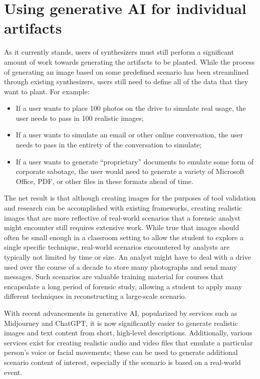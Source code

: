 \documentclass[letterpaper,12pt]{report}
\def\tightlist{}
\begin{document}
\section{Using generative AI for individual
artifacts}\label{using-generative-ai-for-individual-artifacts}

As it currently stands, users of synthesizers must still perform a
significant amount of work towards generating the artifacts to be
planted. While the process of generating an image based on some
predefined scenario has been streamlined through existing synthesizers,
users still need to define all of the data that they want to plant. For
example:

\begin{itemize}
\tightlist
\item
  If a user wants to place 100 photos on the drive to simulate real
  usage, the user needs to pass in 100 realistic images;
\item
  If a user wants to simulate an email or other online conversation, the
  user needs to pass in the entirety of the conversation to simulate;
\item
  If a user wants to generate ``proprietary'' documents to emulate some
  form of corporate sabotage, the user would need to generate a variety
  of Microsoft Office, PDF, or other files in these formats ahead of
  time.
\end{itemize}

The net result is that although creating images for the purposes of tool
validation and research can be accomplished with existing frameworks,
creating realistic images that are more reflective of real-world
scenarios that a forensic analyst might encounter still requires
extensive work. While true that images should often be small enough in a
classroom setting to allow the student to explore a single specific
technique, real-world scenarios encountered by analysts are typically
not limited by time or size. An analyst might have to deal with a drive
used over the course of a decade to store many photographs and send many
messages. Such scenarios are valuable training material for courses that
encapsulate a long period of forensic study, allowing a student to apply
many different techniques in reconstructing a large-scale scenario.

With recent advancements in generative AI, popularized by services such
as Midjourney and ChatGPT, it is now significantly easier to generate
realistic images and text content from short, high-level descriptions.
Additionally, various services exist for creating realistic audio and
video files that emulate a particular person's voice or facial
movements; these can be used to generate additional scenario content of
interest, especially if the scenario is based on a real-world event.
\end{document}
